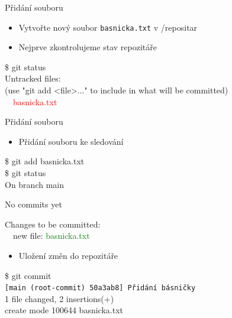 \documentclass{beamer}
\newcommand{\ts}{\raisebox{-0.25em}{\textasciitilde}}
\begin{document}
	
	
	\begin{frame}[fragile]{Přidání souboru}
		
		\begin{itemize}
			\item Vytvořte nový soubor  \texttt{basnicka.txt} v \ts/repositar
			\item Nejprve zkontrolujeme stav repozitáře
		\end{itemize}
	
	{\ttfamily\small
		\$ git status \\
		Untracked files: \\
		(use "git add <file>..." to include in what will be committed) \\
		\ \ \textcolor{red}{basnicka.txt}
	}
	
		\begin{center}
		
		\end{center}
	
	\end{frame}
	
\begin{frame}[fragile]{Přidání souboru}
	
	\begin{itemize}
		\item Přidání souboru ke sledování
	\end{itemize}
	
	{\ttfamily\small
		\$ git add basnicka.txt \\
		\$ git status \\
		On branch main
		
		No commits yet
		
		Changes to be committed: \\
		\ \ new file:   \textcolor{green}{basnicka.txt}
	}
	
	\hspace{0.5cm}
	\begin{itemize}
		\item Uložení změn do repozitáře
	\end{itemize}
	
	{\ttfamily\small
		\$ git commit \\
		\texttt{[main (root-commit) 50a3ab8] Přidání básničky} \\
		1 file changed, 2 insertions(+) \\
		create mode 100644 basnicka.txt
	}
	
\end{frame}
\end{document}
